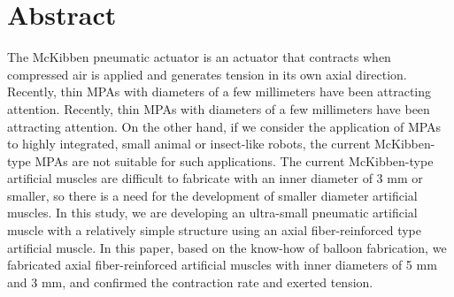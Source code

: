 \newpage
\section*{Abstract}
The McKibben pneumatic actuator is an actuator that contracts when compressed air is applied and generates tension in its own axial direction.
Recently, thin MPAs with diameters of a few millimeters have been attracting attention. Recently, thin MPAs with diameters of a few millimeters have been attracting attention. On the other hand, if we consider the application of MPAs to highly integrated, small animal or insect-like robots, the current McKibben-type MPAs are not suitable for such applications.
The current McKibben-type artificial muscles are difficult to fabricate with an inner diameter of 3 mm or smaller, so there is a need for the development of smaller diameter artificial muscles. In this study, we are developing an ultra-small pneumatic artificial muscle with a relatively simple structure using an axial fiber-reinforced type artificial muscle.
In this paper, based on the know-how of balloon fabrication, we fabricated axial fiber-reinforced artificial muscles with inner diameters of 5 mm and 3 mm, and confirmed the contraction rate and exerted tension.

